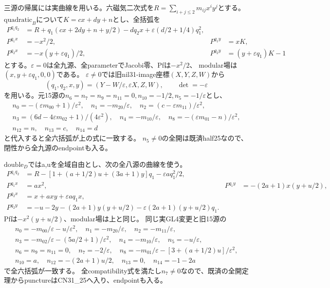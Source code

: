 \documentclass[a4paper,11pt]{ltjsarticle}
\theoremstyle{definition}
\begin{document}
三源の帰属には実曲線を用いる。六磁気二次式を$R=\sum_{i+j\le2}m_{ij}x^iy^j$とする。
$\mathrm{quadratic}_B$について$K=cx+dy+n$とし、全括弧を
\[
\begin{aligned}
 P^{q_1q_2}&=R+q_1(cx+2dy+n+y/2)-dq_2x+\varepsilon(d/2+1/4)q_1^2,\\
 P^{q_1x}&=-x^2/2,&P^{q_1y}&=xK,\\
 P^{q_2x}&=-x(y+\varepsilon q_1)/2,&P^{q_2y}&=(y+\varepsilon q_1)K-1
\end{aligned}
\]
とする。$\varepsilon=0$は全九源、全parameterでJacobi零、Pfは$-x^2/2$、
modular場は$(x,y+\varepsilon q_1,0,0)$である。
$\varepsilon\ne0$では旧nil31-image座標$(X,Y,Z,W)$から
\[
 (q_1,q_2,x,y)=(Y-W/\varepsilon,\varepsilon X,Z,W),\qquad\det=-\varepsilon
\]
を用いる。元15源の$n_6=n_7=n_9=n_{11}=0,n_{10}=-1/2,n_5=-1/\varepsilon$とし、
\[
\begin{gathered}
 n_0=-(\varepsilon m_{00}+1)/\varepsilon^2,\quad n_1=-m_{20}/\varepsilon,
 \quad n_2=(c-\varepsilon m_{11})/\varepsilon^2,\\
 n_3=(6d-4\varepsilon m_{02}+1)/(4\varepsilon^2),\quad n_4=-m_{10}/\varepsilon,
 \quad n_8=-(\varepsilon m_{01}-n)/\varepsilon^2,\\
 n_{12}=n,\quad n_{13}=c,\quad n_{14}=d
\end{gathered}
\]
と代入すると全六括弧が上の式に一致する。
$n_5\ne0$の全開は既済half25なので、閉性から全九源のendpointも入る。

$\mathrm{double}_D$ではa,uを全域自由とし、次の全八源の曲線を使う。
\[
\begin{aligned}
 P^{q_1q_2}&=R-[1+(a+1/2)u+(3a+1)y]q_1-\varepsilon a q_1^2/2,\\
 P^{q_1x}&=ax^2,&P^{q_1y}&=-(2a+1)x(y+u/2),\\
 P^{q_2x}&=x+axy+\varepsilon aq_1x,\\
 P^{q_2y}&=-u-2y-(2a+1)y(y+u/2)-\varepsilon(2a+1)(y+u/2)q_1.
\end{aligned}
\]
Pfは$-x^2(y+u/2)$、modular場は上と同じ。
同じ実GL4変更と旧15源の
\[
\begin{gathered}
 n_0=-m_{00}/\varepsilon-u/\varepsilon^2,\quad n_1=-m_{20}/\varepsilon,
 \quad n_2=-m_{11}/\varepsilon,\\
 n_3=-m_{02}/\varepsilon-(5a/2+1)/\varepsilon^2,\quad n_4=-m_{10}/\varepsilon,
 \quad n_5=-u/\varepsilon,\\
 n_6=n_9=n_{11}=0,\quad n_7=-2/\varepsilon,\quad
 n_8=-m_{01}/\varepsilon-[3+(a+1/2)u]/\varepsilon^2,\\
 n_{10}=a,\quad n_{12}=-(2a+1)u/2,\quad n_{13}=0,\quad n_{14}=-1-2a
\end{gathered}
\]
で全六括弧が一致する。
全compatibility式を満たし$n_7\ne0$なので、既済の全開定理からpunctureはCN31\_25へ入り、endpointも入る。
\end{document}
